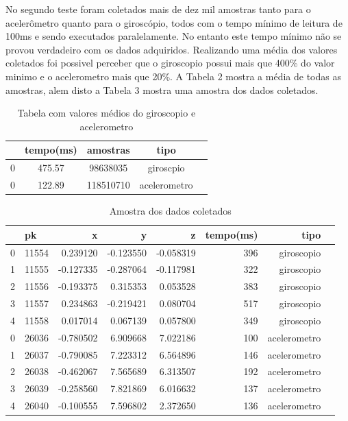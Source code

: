 No segundo teste foram coletados mais de dez mil amostras tanto para o acelerômetro quanto para o giroscópio, todos com o tempo mínimo de leitura de  100ms e sendo executados paralelamente. No entanto este tempo mínimo não se provou verdadeiro com os dados adquiridos. Realizando uma média dos valores coletados foi possivel perceber que o giroscopio possui mais que 400\% do valor minimo e o acelerometro mais que 20\%. A Tabela 2 mostra a média de todas as amostras, alem disto a Tabela 3 mostra uma amostra dos dados coletados.  




\begin{table}[]
    \centering
    \caption{Tabela com valores médios do giroscopio e acelerometro}
    \begin{tabular*}{\textwidth}{l@{\extracolsep{\fill}}cccc}
\toprule
{} &           tempo(ms) &  amostras  & tipo\\
\midrule
0 &  475.57 &  98638035 &  giroscpio \\
0 &  122.89 &  118510710 &  acelerometro \\
\bottomrule
\end{tabular*}

\end{table}



\begin{table}[]
    \centering
    \caption{Amostra dos dados coletados}

\begin{tabular*}{\textwidth}{l@{\extracolsep{\fill}}lrrrrrl}
\toprule
{} &     pk &         x &         y &         z &  tempo(ms) &          tipo \\
\midrule
0 &  11554 &  0.239120 & -0.123550 & -0.058319 &        396 &    giroscopio \\
1 &  11555 & -0.127335 & -0.287064 & -0.117981 &        322 &    giroscopio \\
2 &  11556 & -0.193375 &  0.315353 &  0.053528 &        383 &    giroscopio \\
3 &  11557 &  0.234863 & -0.219421 &  0.080704 &        517 &    giroscopio \\
4 &  11558 &  0.017014 &  0.067139 &  0.057800 &        349 &    giroscopio \\
0 &  26036 & -0.780502 &  6.909668 &  7.022186 &        100 &  acelerometro \\
1 &  26037 & -0.790085 &  7.223312 &  6.564896 &        146 &  acelerometro \\
2 &  26038 & -0.462067 &  7.565689 &  6.313507 &        192 &  acelerometro \\
3 &  26039 & -0.258560 &  7.821869 &  6.016632 &        137 &  acelerometro \\
4 &  26040 & -0.100555 &  7.596802 &  2.372650 &        136 &  acelerometro \\
\bottomrule
\end{tabular*} 
\end{table}




